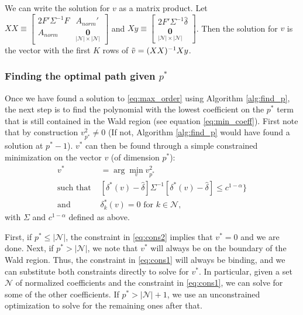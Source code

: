 \documentclass[12pt]{article}
\begin{document}
We can write the solution for $v$ as a matrix product. Let $XX \equiv \begin{bmatrix} 2F'\Sigma^{-1}F & A_{norm}' \\ A_{norm} & \underset{|\mathcal{N}| \times |\mathcal{N}|} {\mathbf{0}} \end{bmatrix} $ and $Xy \equiv \begin{bmatrix} 2F'\Sigma^{-1}\widehat{\delta} \\ \underset{|\mathcal{N}| \times |\mathcal{N}|}{\mathbf{0}} \end{bmatrix} $. Then the solution for $v$ is the vector with the first $K$ rows of $\Tilde{v} = (XX)^{-1} Xy$.

\subsubsection{Finding the optimal path given $p^*$}


Once we have found a solution to \eqref{eq:max_order} using Algorithm \ref{alg:find_p}, the next step is to find the polynomial with the lowest coefficient on the $p^*$ term that is still contained in the Wald region (see equation \ref{eq:min_coeff}).
First note that by construction $v^2_{p^*} \ne 0$ (If not, Algorithm \ref{alg:find_p} would have found a solution at $p^*-1$). $v^*$ can then be found through a simple constrained minimization on the vector $v$ (of dimension $p^*$):
\begin{align}
v^* &= \arg\min_{v} v_{p^*}^2 \label{eq:obj}\\
\text{such that }  & [\delta^*(v)-\widehat{\delta}]\Sigma^{-1}[\delta^*(v)-\widehat{\delta}] \le c^{1-\alpha}\} \label{eq:cons1}\\
\text{and } & \delta_{k}^*(v)=0 \text{ for } k \in \mathcal{N}, \label{eq:cons2}
\end{align}
with $\Sigma$ and $c^{1-\alpha}$ defined as above.

First, if $p^* \le |\mathcal{N}|$, the constraint in \eqref{eq:cons2} implies that $v^*=0$ and we are done.
Next, if $p^* > |\mathcal{N}|$, we note that $v^*$ will always be on the boundary of the Wald region.
Thus, the constraint in \eqref{eq:cons1} will always be binding, and we can substitute both constraints directly to solve for $v^*$.
In particular, given a set $\mathcal{N}$ of normalized coefficients and the constraint in \eqref{eq:cons1}, we can solve for some of the other coefficients.
If $p^* > |\mathcal{N}|+1$, we use an unconstrained optimization to solve for the remaining ones after that.
\end{document}
